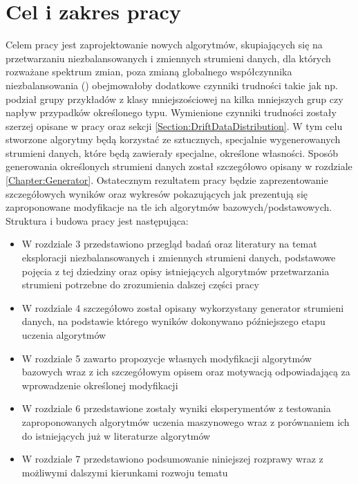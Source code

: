 \chapter{Cel i zakres pracy}

\noindent Celem pracy jest zaprojektowanie nowych algorytmów, skupiających się na przetwarzaniu niezbalansowanych i zmiennych strumieni danych, dla których rozważane spektrum zmian, poza zmianą globalnego współczynnika niezbalansowania () obejmowałoby dodatkowe czynniki trudności takie jak np. podział grupy przykładów z klasy mniejszościowej na kilka mniejszych grup czy napływ przypadków określonego typu. Wymienione czynniki trudności zostały szerzej opisane w pracy \cite{Article:TypyPrzykladow} oraz sekcji \ref{Section:DriftDataDistribution}. W tym celu stworzone algorytmy będą korzystać ze sztucznych, specjalnie wygenerowanych strumieni danych, które będą zawierały specjalne, określone własności. Sposób generowania określonych strumieni danych został szczegółowo opisany w rozdziale \ref{Chapter:Generator}. Ostatecznym rezultatem pracy będzie zaprezentowanie szczegółowych wyników oraz wykresów pokazujących jak prezentują się zaproponowane modyfikacje na tle ich algorytmów bazowych/podstawowych.\\

\noindent Struktura i budowa pracy jest następująca:

\begin{itemize}
    \item W rozdziale 3 przedstawiono przegląd badań oraz literatury na temat eksploracji niezbalansowanych i zmiennych strumieni danych, podstawowe pojęcia z tej dziedziny oraz opisy istniejących algorytmów przetwarzania strumieni potrzebne do zrozumienia dalszej części pracy
    \item W rozdziale 4 szczegółowo został opisany wykorzystany generator strumieni danych, na podstawie którego wyników dokonywano późniejszego etapu uczenia algorytmów
    \item W rozdziale 5 zawarto propozycje własnych modyfikacji algorytmów bazowych wraz z ich szczegółowym opisem oraz motywacją odpowiadającą za wprowadzenie określonej modyfikacji
    \item W rozdziale 6 przedstawione zostały wyniki eksperymentów z testowania zaproponowanych algorytmów uczenia maszynowego wraz z porównaniem ich do istniejących już w literaturze algorytmów
    \item W rozdziale 7 przedstawiono podsumowanie niniejszej rozprawy wraz z możliwymi dalszymi kierunkami rozwoju tematu
\end{itemize}

